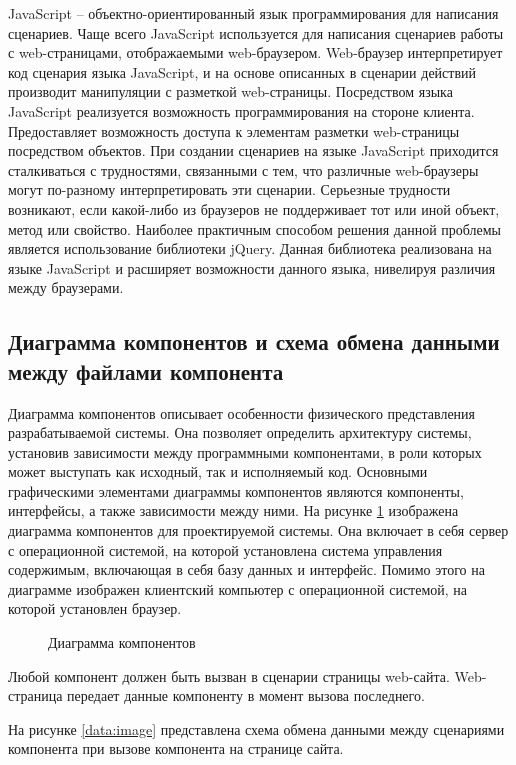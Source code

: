 JavaScript – объектно-ориентированный язык программирования для написания сценариев. Чаще всего JavaScript используется для написания сценариев работы с web-страницами, отображаемыми web-браузером. Web-браузер интерпретирует код сценария языка JavaScript, и на основе описанных в сценарии действий производит манипуляции с разметкой web-страницы. Посредством языка JavaScript реализуется возможность программирования на стороне клиента. Предоставляет возможность доступа к элементам разметки web-страницы посредством объектов. При создании сценариев на языке JavaScript приходится сталкиваться с трудностями, связанными с тем, что различные web-браузеры могут по-разному интерпретировать эти сценарии. Серьезные трудности возникают, если какой-либо из браузеров не поддерживает тот или иной объект, метод или свойство. Наиболее практичным способом решения данной проблемы является использование библиотеки jQuery. Данная библиотека реализована на языке JavaScript и расширяет возможности данного языка, нивелируя различия между браузерами.

\subsection{Диаграмма компонентов и схема обмена данными между файлами компонента}

Диаграмма компонентов описывает особенности физического представления разрабатываемой системы. Она позволяет определить архитектуру системы, установив зависимости между программными компонентами, в роли которых может выступать как исходный, так и исполняемый код. Основными графическими элементами диаграммы компонентов являются компоненты, интерфейсы, а также зависимости между ними. На рисунке \ref{comp:image} изображена диаграмма компонентов для проектируемой системы. Она включает в себя сервер с операционной системой, на которой установлена система управления содержимым, включающая в себя базу данных и интерфейс. Помимо этого на диаграмме изображен клиентский компьютер с операционной системой, на которой установлен браузер.

\begin{figure}[h]
\caption{Диаграмма компонентов}
\label{comp:image}
\end{figure}

Любой компонент должен быть вызван в сценарии страницы web-сайта. Web-страница передает данные компоненту в момент вызова последнего.

На рисунке \ref{data:image} представлена схема обмена данными между сценариями компонента при вызове компонента на странице сайта.

